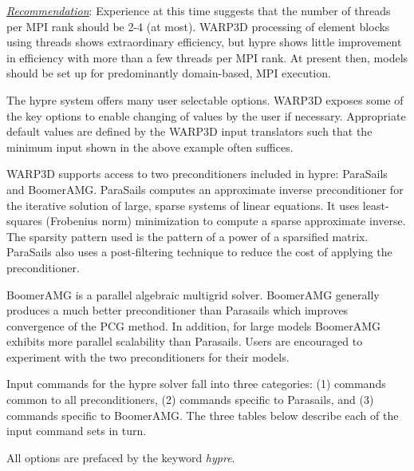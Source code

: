 \documentclass[11pt]{report}
\numberwithin{equation}{section}
\newcommand{\ul} {\underline}
\newcommand{\ti}{\emph}
\begin{document}
\ti{\ul{Recommendation}}: Experience at this time suggests 
that the number of threads per MPI rank
should be 2-4 (at most). WARP3D processing of element blocks using threads shows
extraordinary efficiency, but hypre shows little improvement in
efficiency with more than a few threads per MPI rank. At present then, models should
be set up for predominantly domain-based, MPI execution.

The hypre system offers many user selectable options. WARP3D exposes some of the key
options to enable changing of values by the user if necessary. Appropriate default 
values are defined by the
WARP3D input translators such that the minimum input shown in the above example
often suffices.  

WARP3D supports access to two preconditioners included in hypre: ParaSails and BoomerAMG.
ParaSails computes an approximate inverse preconditioner for the iterative solution of large, 
sparse systems of linear equations. It uses least-squares (Frobenius norm) minimization 
to compute a sparse approximate inverse. The sparsity pattern used is 
the pattern of a power of a sparsified matrix. ParaSails also uses a 
post-filtering technique to reduce the cost of applying the preconditioner. 

BoomerAMG is a parallel algebraic multigrid solver.  BoomerAMG 
generally produces a much better preconditioner than Parasails which improves
convergence of the PCG method.  In addition, for large models BoomerAMG exhibits more
parallel scalability than Parasails.  
Users are encouraged to experiment with the two preconditioners for their models.

Input commands for the hypre solver fall into three categories: (1) commands 
common to all preconditioners, (2) commands specific to Parasails, and (3) commands
specific to BoomerAMG.  The three tables below describe each of the input command sets in turn.

All options are prefaced by the keyword \ti{hypre}.
\end{document}
